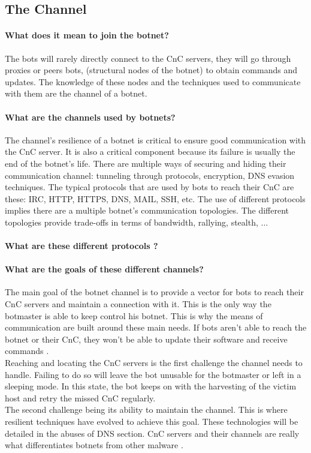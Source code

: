 \subsection{The Channel}
\paragraph{What does it mean to join the botnet?} The bots will rarely directly connect to the CnC servers, they will go through proxies or peers bots, (structural nodes of the botnet) to obtain commands and updates. The knowledge of these nodes and the techniques used to communicate with them are the channel of a botnet.
\paragraph{What are the channels used by botnets?} The channel's resilience of a botnet is critical to ensure good communication with the CnC server. It is also a critical component because its failure is usually the end of the botnet's life. There are multiple ways of securing and hiding their communication channel: tunneling through protocols, encryption, DNS evasion techniques.
\cite{bot-intro}
The typical protocols that are used by bots to reach their CnC are these: IRC, HTTP, HTTPS, DNS, MAIL, SSH, etc. The use of different protocols implies there are a multiple botnet's communication topologies. The different topologies provide trade-offs in terms of bandwidth, rallying, stealth, ...

\paragraph{What are these different protocols ?}

\paragraph{What are the goals of these different channels?}
The main goal of the botnet channel is to provide a vector for bots to reach their CnC servers and maintain a connection with it. This is the only way the botmaster is able to keep control his botnet. This is why the means of communication are built around these main needs. If bots aren't able to reach the botnet or their CnC, they won't be able to update their software and receive commands \cite{bot-com}.\\ 
Reaching and locating the CnC servers is the first challenge the channel needs to handle. Failing to do so will leave the bot unusable for the botmaster or left in a sleeping mode. In this state, the bot keeps on with the harvesting of the victim host and retry the missed CnC regularly. \\
The second challenge being its ability to maintain the channel. This is where resilient techniques have evolved to achieve this goal. These technologies will be detailed in the abuses of DNS section. CnC servers and their channels are really what differentiates botnets from other malware \cite{cont-host}.
	
